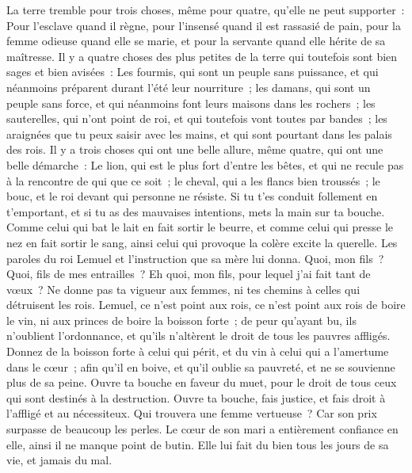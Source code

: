 \begin{multicols}{2}
La terre tremble pour trois choses, même pour quatre, qu'elle ne peut supporter~:
Pour l'esclave quand il règne, pour l'insensé quand il est rassasié de pain,
pour la femme odieuse quand elle se marie, et pour la servante quand elle hérite de sa maîtresse.
Il y a quatre choses des plus petites de la terre qui toutefois sont bien sages et bien avisées~:
Les fourmis, qui sont un peuple sans puissance, et qui néanmoins préparent durant l'été leur nourriture~;
les damans, qui sont un peuple sans force, et qui néanmoins font leurs maisons dans les rochers~;
les sauterelles, qui n'ont point de roi, et qui toutefois vont toutes par bandes~;
les araignées que tu peux saisir avec les mains, et qui sont pourtant dans les palais des rois.
Il y a trois choses qui ont une belle allure, même quatre, qui ont une belle démarche~:
Le lion, qui est le plus fort d'entre les bêtes, et qui ne recule pas à la rencontre de qui que ce soit~;
le cheval, qui a les flancs bien troussés~; le bouc, et le roi devant qui personne ne résiste.
Si tu t'es conduit follement en t'emportant, et si tu as des mauvaises intentions, mets la main sur ta bouche.
Comme celui qui bat le lait en fait sortir le beurre, et comme celui qui presse le nez en fait sortir le sang, ainsi celui qui provoque la colère excite la querelle.
\VerseOne{}Les paroles du roi Lemuel et l'instruction que sa mère lui donna.
Quoi, mon fils~? Quoi, fils de mes entrailles~? Eh quoi, mon fils, pour lequel j'ai fait tant de vœux~?
Ne donne pas ta vigueur aux femmes, ni tes chemins à celles qui détruisent les rois.
Lemuel, ce n'est point aux rois, ce n'est point aux rois de boire le vin, ni aux princes de boire la boisson forte~;
de peur qu'ayant bu, ils n'oublient l'ordonnance, et qu'ils n'altèrent le droit de tous les pauvres affligés.
Donnez de la boisson forte à celui qui périt, et du vin à celui qui a l'amertume dans le cœur~;
afin qu'il en boive, et qu'il oublie sa pauvreté, et ne se souvienne plus de sa peine.
Ouvre ta bouche en faveur du muet, pour le droit de tous ceux qui sont destinés à la destruction.
Ouvre ta bouche, fais justice, et fais droit à l'affligé et au nécessiteux.
 Qui trouvera une femme vertueuse~? Car son prix surpasse de beaucoup les perles.
 Le cœur de son mari a entièrement confiance en elle, ainsi il ne manque point de butin.
 Elle lui fait du bien tous les jours de sa vie, et jamais du mal.

\end{multicols}
